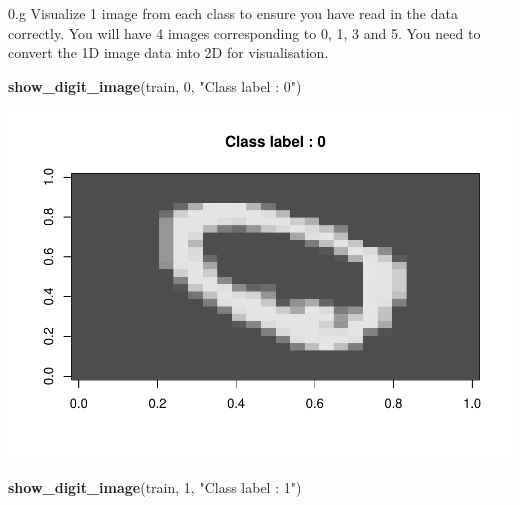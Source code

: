 \documentclass[]{article}
\newenvironment{Shaded}{\begin{snugshade}}{\end{snugshade}}
\newcommand{\KeywordTok}[1]{\textcolor[rgb]{0.13,0.29,0.53}{\textbf{{#1}}}}
\newcommand{\DataTypeTok}[1]{\textcolor[rgb]{0.13,0.29,0.53}{{#1}}}
\newcommand{\DecValTok}[1]{\textcolor[rgb]{0.00,0.00,0.81}{{#1}}}
\newcommand{\StringTok}[1]{\textcolor[rgb]{0.31,0.60,0.02}{{#1}}}
\newcommand{\OtherTok}[1]{\textcolor[rgb]{0.56,0.35,0.01}{{#1}}}
\newcommand{\NormalTok}[1]{{#1}}
\begin{document}
0.g Visualize 1 image from each class to ensure you have read in the
data correctly. You will have 4 images corresponding to 0, 1, 3 and 5.
You need to convert the 1D image data into 2D for visualisation.

\begin{Shaded}
\end{Shaded}

\begin{Shaded}
\begin{Highlighting}[]
\KeywordTok{show_digit_image}\NormalTok{(train, }\DecValTok{0}\NormalTok{, }\StringTok{"Class label : 0"}\NormalTok{)}
\end{Highlighting}
\end{Shaded}

\includegraphics{hw3_files/figure-latex/unnamed-chunk-6-1.pdf}

\begin{Shaded}
\begin{Highlighting}[]
\KeywordTok{show_digit_image}\NormalTok{(train, }\DecValTok{1}\NormalTok{, }\StringTok{"Class label : 1"}\NormalTok{)}
\end{Highlighting}
\end{Shaded}
\end{document}
